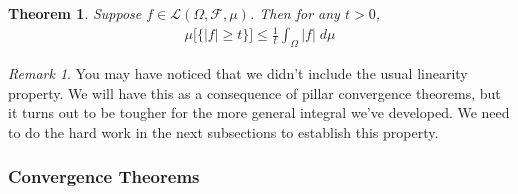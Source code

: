 \documentclass[12pt]{article}
\theoremstyle{plain}
\newtheorem{thm}{Theorem}[section]
\theoremstyle{definition}
\theoremstyle{remark}
\newtheorem*{rmk}{Remark}
\newcommand{\sF}{\mathscr{F}}
\begin{document}
\begin{thm}
Suppose $f\in\mathscr{L}(\Omega,\sF,\mu)$. Then for any $t>0$,
\begin{align*}
  \mu\big[\{|f|\geq t\}\big] \leq \frac{1}{t}\int_{\Omega} |f|\; d\mu
\end{align*}
\end{thm}

\begin{rmk}
You may have noticed that we didn't include the usual linearity
property. We will have this as a consequence of pillar convergence
theorems, but it turns out to be tougher for the more general integral
we've developed. We need to do the hard work in the next subsections to
establish this property.
\end{rmk}

\subsubsection{Convergence Theorems}
\end{document}

